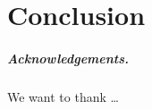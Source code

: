 \documentclass[a4paper,USenglish]{lipics-v2016}
\begin{document}

\section{Conclusion}\label{sec:conclusion}

\subparagraph*{Acknowledgements.}

We want to thank \dots




\end{document}

